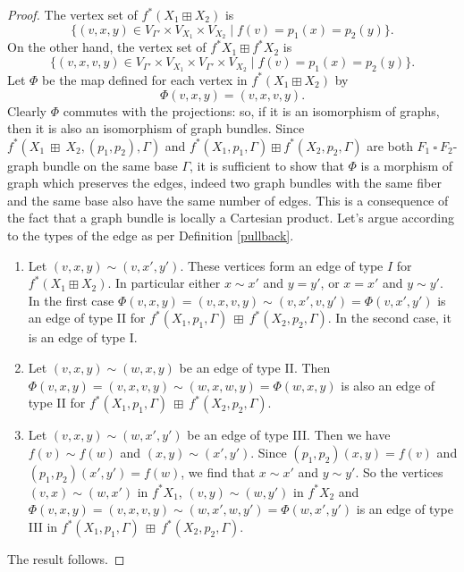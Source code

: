 \documentclass[10pt,a4paper]{amsart}
\begin{document}
\begin{proof}
The vertex set of $f^*(X_1 \boxplus X_2)$ is
\begin{equation}
\{(v,x, y) \in V_{\Gamma'}\times V_{X_1} \times V_{X_2} \mid f(v)= p_1(x)= p_2(y)\}.    
\end{equation}
On the other hand, the vertex set of $f^*X_1 \boxplus f^*X_2$ is
\begin{equation}
\{(v,x, v, y) \in V_{\Gamma'} \times V_{X_1} \times V_{\Gamma'} \times V_{X_2} \mid f(v)= p_1(x)= p_2(y)\}.    
\end{equation}
Let $\Phi$ be the map defined for each vertex in $f^*(X_1 \boxplus X_2)$ by \begin{equation}\Phi(v,x, y) = (v,x, v, y).\end{equation} Clearly $\Phi$ commutes with the projections: so, if it is an isomorphism of graphs, then it is also an isomorphism of graph bundles. Since $f^*(X_1  \ \boxplus \  X_2, (p_1,p_2), \Gamma)$ and $f^*(X_1, p_1, \Gamma) \boxplus f^*(X_2, p_2, \Gamma)$ are both $F_1  \ \square  \ F_2$-graph bundle on the same base $\Gamma$, it is sufficient to show that $\Phi$ is a morphism of graph which preserves the edges, indeed two graph bundles with the same fiber and the same base also have the same number of edges. This is a consequence of the fact that a graph bundle is locally a Cartesian product. Let's argue according to the types of the edge as per Definition \ref{pullback}.

\begin{enumerate}
    \item[(1).] 
Let $(v,x, y)\sim(v,x',y')$. These vertices form an edge of type $I$ for $f^*(X_1 \boxplus X_2)$. In particular either $x \sim x'$ and $y=y'$, or $x = x'$ and $y \sim y'$. In the first case $\Phi(v,x, y) = (v,x, v, y)\sim(v,x',v, y')= \Phi(v,x', y')$ is an edge of type II for $f^*(X_1, p_1, \Gamma)  \ \boxplus \ f^*(X_2, p_2, \Gamma)$. In the second case, it is an edge of type I.


    \item[(2).] 
Let $(v,x, y)\sim(w,x,y)$ be an edge of type II. Then $\Phi(v,x, y) = (v,x, v, y)\sim(w,x,w, y)= \Phi(w,x, y)$ is also an edge of type II for $f^*(X_1, p_1, \Gamma)  \ \boxplus  \ f^*(X_2, p_2, \Gamma)$.


    \item[(3).] 
Let $(v,x, y)\sim(w,x',y')$ be an edge of type III. Then we have $f(v) \sim f(w)$ and $(x,y) \sim (x',y')$.  Since $(p_1,p_2)(x,y)= f(v)$ and $(p_1,p_2)(x',y')= f(w)$, we find that $x \sim x'$ and $y\sim y'$. So the vertices $(v,x) \sim (w,x')$ in $f^*X_1$, $(v,y) \sim (w,y')$ in $f^*X_2$ and $\Phi(v,x, y) = (v,x, v, y)\sim(w,x',w, y')= \Phi(w,x', y')$ is an edge of type III in $f^*(X_1, p_1, \Gamma)  \ \boxplus  \ f^*(X_2, p_2, \Gamma)$. 
\end{enumerate}
The result follows.
\end{proof}
\end{document}

